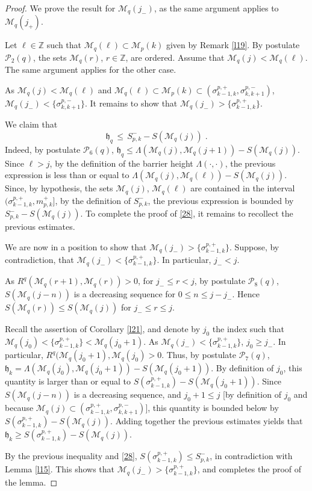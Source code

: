 \documentclass[reqno]{amsart}
\theoremstyle{plain}
\theoremstyle{definition}
\newcommand{\mc}[1]{{\mathcal #1}}
\newcommand{\mf}[1]{{\mathfrak #1}}
\newcommand{\bb}[1]{{\mathbb #1}}
\newcommand{\ms}[1]{{\mathscr #1}}
\newcounter{as}[section]
\newcommand{\<}{\langle}
\renewcommand{\>}{\rangle}
\begin{document}
\begin{proof}
We prove the result for $\ms M_{q}(j_-)$, as the
same argument applies to $\ms M_{q}(j_+)$.

Let $\ell \in \bb Z$ such that $\ms M_{q}(\ell) \subset \ms M_{p}(k)$
given by Remark \ref{l19}.  By postulate $\mc P_2(q)$, the sets
$\ms M_{q}(r)$, $r\in \bb Z$, are ordered. Assume that
$\ms M_{q}(j) < \ms M_{q}(\ell)$. The same argument applies for the
other case.

As $\ms M_{q}(j) < \ms M_{q}(\ell)$ and
$\ms M_{q}(\ell) \subset \ms M_{p}(k) \subset
(\sigma^{p,+}_{k-1,k}, \sigma^{p,-}_{k,k+1})$,
$\ms M_{q}(j_-) < \{\sigma^{p,-}_{k,k+1}\}$. It remains
to show that
$\ms M_{q}(j_-) > \{\sigma^{p,+}_{k-1,k}\}$.

We claim that
\begin{equation}
\label{28}
\mf h_q \,\le\, S^-_{p,k} - S(\ms M_{q}(j))\;.
\end{equation}
Indeed, by postulate $\mc P_6(q)$,
$\mf h_q \le \Lambda(\ms M_{q}(j), \ms M_{q}(j +1 ) ) - S(\ms
M_{q}(j))$. Since $\ell > j$, by the definition of the barrier height
$\Lambda (\cdot, \cdot)$, the previous expression is less than or
equal to $\Lambda(\ms M_{q}(j), \ms M_{q}(\ell)) - S(\ms
M_{q}(j))$. Since, by hypothesis, the sets $\ms M_{q}(j)$,
$\ms M_{q}(\ell)$ are contained in the interval
$(\sigma^{p,+}_{k-1,k}, m^+_{p,k}]$, by the definition of $S^-_{p,k}$,
the previous expression is bounded by $S^-_{p,k} - S(\ms M_{q}(j))$. To
complete the proof of \eqref{28}, it remains to recollect the previous
estimates.

We are now in a position to show that
$\ms M_{q}(j_-) > \{\sigma^{p,+}_{k-1,k}\}$.  
Suppose, by contradiction, that
$\ms M_{q}(j_-) < \{\sigma^{p,+}_{k-1,k}\}$.  In
particular, $j_-<j$.

As $R^q(\ms M_q(r+1), \ms M_q(r))>0$, for $j_- \le r<j$, by postulate
$\mc P_8(q)$, $S(\ms M_{q}(j-n))$ is a decreasing sequence for
$0\le n\le j-j_-$. Hence $S(\ms M_{q}(r)) \le S(\ms M_{q}(j))$ for
$j_- \le r \le j$.

Recall the assertion of Corollary \ref{l21}, and denote by $j_0$ the
index such that
$\ms M_{q}(j_0) < \{\sigma^{p,+}_{k-1,k}\} < \ms M_{q}(j_0+1)$. As
$\ms M_{q}(j_-) < \{\sigma^{p,+}_{k-1,k}\}$, $j_0\ge j_-$. In
particular, $R^q(\ms M_q(j_0+1), \ms M_q(j_0)>0$.  Thus, by postulate
$\mc P_7(q)$,
$\mf h_k = \Lambda(\ms M_{q}(j_0), \ms M_{q}(j_0+1)) - S(\ms
M_{q}(j_0+1))$. By definition of $j_0$, this quantity is larger than
or equal to $S(\sigma^{p,+}_{k-1,k}) - S(\ms M_{q}(j_0+1))$.  Since
$S(\ms M_{q}(j-n))$ is a decreasing sequence, and $j_0+1\le j$ [by
definition of $j_0$ and because
$\ms M_{q}(j) \subset (\sigma^{p,+}_{k-1,k}, \sigma^{p,-}_{k,k+1})]$,
this quantity is bounded below by
$S(\sigma^{p,+}_{k-1,k}) - S(\ms M_{q}(j))$.  Adding together the
previous estimates yields that
$\mf h_k \ge S(\sigma^{p,+}_{k-1,k}) - S(\ms M_{q}(j))$.

By the previous inequality and \eqref{28},
$S(\sigma^{p,+}_{k-1,k}) \le S^-_{p,k}$, in contradiction with Lemma
\ref{l15}. This shows that
$\ms M_{q}(j_-) > \{\sigma^{p,+}_{k-1,k}\}$, and
completes the proof of the lemma.
\end{proof}
\end{document}
